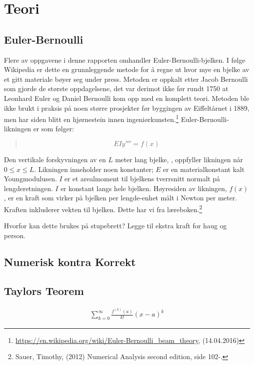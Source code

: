 \section{Teori}

\subsection{Euler-Bernoulli}
Flere av oppgavene i denne rapporten omhandler Euler-Bernoulli-bjelken. I følge Wikipedia er dette en grunnleggende metode for å regne ut hvor mye en bjelke av et gitt materiale bøyer seg under press. Metoden er oppkalt etter Jacob Bernoulli som gjorde de største oppdagelsene, det var derimot ikke før rundt 1750 at Leonhard Euler og Daniel Bernoulli kom opp med en komplett teori. Metoden ble ikke brukt i praksis på noen større prosjekter før byggingen av Eiffeltårnet i 1889, men har siden blitt en hjørnestein innen ingeniørkunsten.\footnote{\url{https://en.wikipedia.org/wiki/Euler-Bernoulli_beam_theory}, (14.04.2016)} Euler-Bernoulli-likningen er som følger:
\begin{quote}
\begin{equation}
EIy''''=f(x)
\end{equation}
\end{quote}
Den vertikale forskyvningen av en $L$ meter lang bjelke, , oppfyller likningen når $0\leq x\leq L$. Likningen inneholder noen konstanter; $E$ er en materialkonstant kalt Youngmodulusen. $I$ er et arealmoment til bjelkens tverrsnitt normalt på lengderetningen. $I$ er konstant langs hele bjelken. Høyresiden av likningen, $f(x)$, er en kraft som virker på bjelken per lengde-enhet målt i Newton per meter. Kraften inkluderer vekten til bjelken. Dette har vi fra læreboken.\footnote{Sauer, Timothy, (2012) Numerical Analysis second edition, side 102-.}

Hvorfor kan dette brukes på stupebrett?
Legge til ekstra kraft for haug og person.

\subsection{Numerisk kontra Korrekt}

\subsection{Taylors Teorem}
\begin{align*}
 \sum_{k = 0}^{\infty}\frac{f^{(k)}(a)}{k!}(x-a)^{k}
 \end{align*}
 
